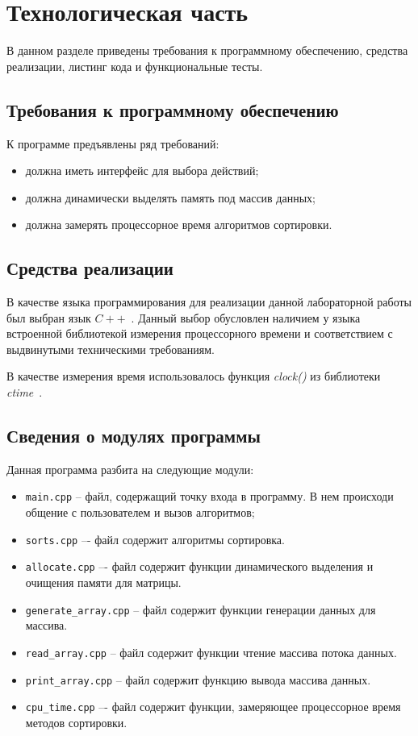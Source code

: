 \chapter{Технологическая часть}

В данном разделе приведены требования к программному обеспечению, средства реализации, листинг кода и функциональные тесты.

\section{Требования к программному обеспечению}


К программе предъявлены ряд требований:

\begin{itemize}[label=---]
	\item должна иметь интерфейс для выбора действий;
	\item должна динамически выделять память под массив данных;
	\item должна замерять процессорное время алгоритмов сортировки.
\end{itemize}

\section{Средства реализации}

В качестве языка программирования для реализации данной лабораторной работы был выбран язык $C++$~\cite{cpp-lang}. Данный выбор обусловлен наличием у языка
встроенной библиотекой измерения процессорного времени и соответствием с выдвинутыми техническими требованиям.

В качестве измерения время использовалось функция \textit{clock()} из библиотеки \textit{ctime}~\cite{cpp-lang-time}. 

\clearpage

\section{Сведения о модулях программы}

Данная программа разбита на следующие модули:

\begin{itemize}[label=---]
	\item \texttt{main.cpp} -- файл, содержащий точку входа в программу. В нем происходи	общение с пользователем и вызов алгоритмов;
	\item \texttt{sorts.cpp} –- файл содержит алгоритмы сортировка.
	\item \texttt{allocate.cpp} –- файл содержит функции динамического выделения и очищения памяти для матрицы.
	\item \texttt{generate\_array.cpp} -- файл содержит функции генерации данных для массива.
	\item \texttt{read\_array.cpp} -- файл содержит функции чтение массива потока данных.
	\item \texttt{print\_array.cpp} -- файл содержит функцию вывода массива данных.
	\item \texttt{cpu\_time.cpp} –- файл содержит функции, замеряющее процессорное время методов сортировки.
\end{itemize}

